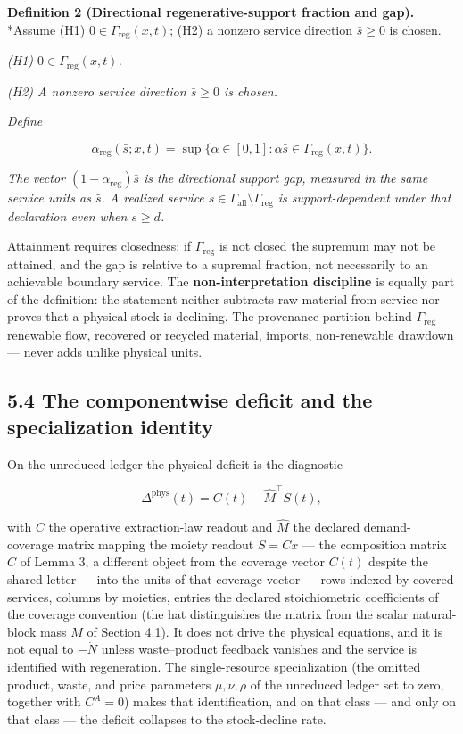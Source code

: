 \documentclass[11pt]{article}
\begin{document}
\textbf{Definition 2 (Directional regenerative-support fraction and gap).} *Assume (H1) \(0\in\Gamma_{\mathrm{reg}}(x,\allowbreak{}t)\); (H2) a nonzero service direction \(\bar s\ge0\) is chosen.

\emph{(H1) \(0 \in \Gamma_{\mathrm{reg}}(x,\allowbreak{}t)\).}

\emph{(H2) A nonzero service direction \(\bar s \ge 0\) is chosen.}

\emph{Define} 

$$\alpha_{\mathrm{reg}}(\bar s; x, t) = \sup\{ \alpha \in [0,1] : \alpha \bar s \in \Gamma_{\mathrm{reg}}(x,t) \}.$$

 \emph{The vector \((1 - \alpha_{\mathrm{reg}})\bar s\) is the directional support gap, measured in the same service units as \(\bar s\). A realized service \(s \in \Gamma_{\mathrm{all}} \setminus \Gamma_{\mathrm{reg}}\) is support-dependent under that declaration even when \(s \ge d\).}

Attainment requires closedness: if \(\Gamma_{\mathrm{reg}}\) is not closed the supremum may not be attained, and the gap is relative to a supremal fraction, not necessarily to an achievable boundary service. The \textbf{non-interpretation discipline} is equally part of the definition: the statement neither subtracts raw material from service nor proves that a physical stock is declining. The provenance partition behind \(\Gamma_{\mathrm{reg}}\) --- renewable flow, recovered or recycled material, imports, non-renewable drawdown --- never adds unlike physical units.

\subsection*{5.4 The componentwise deficit and the specialization identity}\label{54-the-componentwise-deficit-and-the-specialization-identity}

On the unreduced ledger the physical deficit is the diagnostic 

$$\Delta^{\mathrm{phys}}(t) = C(t) - \widehat{M}^\top S(t),$$

 with \(C\) the operative extraction-law readout and \(\widehat{M}\) the declared demand-coverage matrix mapping the moiety readout \(S = Cx\) --- the composition matrix \(C\) of Lemma 3, a different object from the coverage vector \(C(t)\) despite the shared letter --- into the units of that coverage vector --- rows indexed by covered services, columns by moieties, entries the declared stoichiometric coefficients of the coverage convention (the hat distinguishes the matrix from the scalar natural-block mass \(M\) of Section 4.1). It does not drive the physical equations, and it is not equal to \(-\dot N\) unless waste--product feedback vanishes and the service is identified with regeneration. The single-resource specialization (the omitted product, waste, and price parameters \(\mu, \nu, \rho\) of the unreduced ledger set to zero, together with \(C^A = 0\)) makes that identification, and on that class --- and only on that class --- the deficit collapses to the stock-decline rate.
\end{document}
